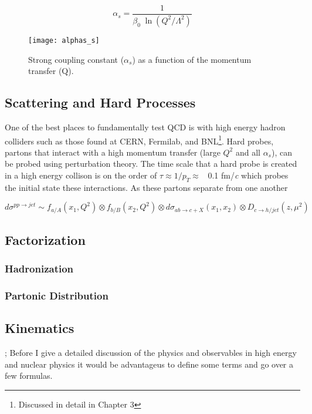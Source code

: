 \begin{equation}
\alpha_{s} = \frac{1}{\beta_{0} \; \ln(Q^{2}/\Lambda^{2} )}
\label{eq:alpha_s}
\end{equation}

\noindent


\begin{figure}[h]
\texttt{[image: alphas\_s]}
\centering
\caption{Strong coupling constant ($\alpha_{s}$) as a function of the momentum transfer (Q)\cite{CMS:2014mna}.}
\label{fig:as}
\end{figure}

\subsection{Scattering and Hard Processes}
One of the best places to fundamentally test QCD is with high energy hadron colliders such as those found at CERN, Fermilab, and BNL\footnote{Discussed in detail in Chapter 3}.  Hard probes, partons that interact with a high momentum transfer (large $Q^{2}$ and all $\alpha_{s}$), can be probed using perturbation theory. The time scale that a hard probe is created in a high energy collison is on the order of $\tau \approx 1/p_{T} \approx$ \, 0.1 fm/\textit{c} which probes the initial state these interactions.  As these partons separate from one another 

\begin{equation}
d\sigma^{pp \rightarrow jet} \sim f_{a/A}(x_{1},Q^{2}) \otimes  f_{b/B}(x_{2},Q^{2}) \otimes d\sigma_{ab \rightarrow c + X} (x_{1},x_{2}) \otimes D_{c \rightarrow h/jet}(z,\mu^{2})
\label{eq:xsection}
\end{equation}

\subsection{Factorization}

\subsubsection{Hadronization}

\subsubsection{Partonic Distribution}


\subsection{Kinematics}\label{sec:kinematics};
Before I give a detailed discussion of the physics and observables in high energy and nuclear physics it would be advantageus to define some terms and go over a few formulas.

